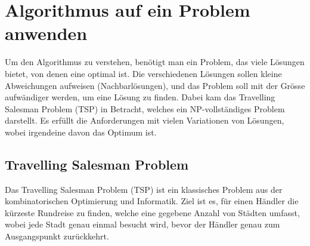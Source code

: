 %
%
%
%
\section{Algorithmus auf ein Problem anwenden
\label{buch:paper:varalg:section:find_problem}}
Um den Algorithmus zu verstehen, benötigt man ein Problem, das 
viele Lösungen bietet, von denen eine optimal ist. Die verschiedenen 
Lösungen sollen kleine Abweichungen aufweisen (Nachbarlösungen), 
und das Problem soll mit der Grösse aufwändiger werden, um eine 
Lösung zu finden. Dabei kam das Travelling Salesman Problem (TSP) 
in Betracht, welches ein NP-vollständiges Problem darstellt. Es 
erfüllt die Anforderungen mit vielen Variationen von Lösungen, wobei
irgendeine davon das Optimum ist.

\subsection{Travelling Salesman Problem
\label{buch:paper:varalg:subsection:tsp}}
Das Travelling Salesman Problem (TSP) ist ein klassisches Problem 
aus der kombinatorischen Optimierung und Informatik. Ziel ist es, 
für einen Händler die kürzeste Rundreise zu finden, welche eine 
gegebene Anzahl von Städten umfasst, wobei jede Stadt 
genau einmal besucht wird, bevor der Händler genau zum Ausgangspunkt 
zurückkehrt. 

